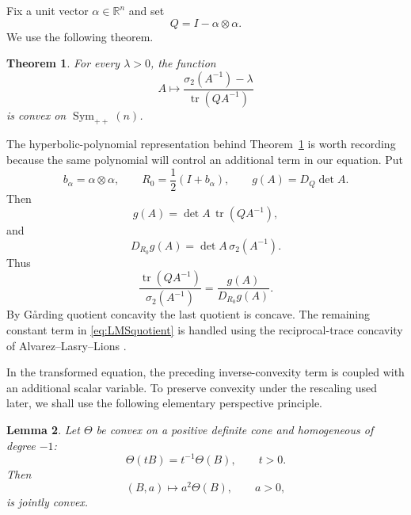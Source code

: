\documentclass{article}
\newtheorem{theorem}{Theorem}[section]
\newtheorem{lemma}[theorem]{Lemma}
\newcommand{\R}{\mathbb R}
\newcommand{\Sym}{\operatorname{Sym}}
\newcommand{\tr}{\operatorname{tr}}
\numberwithin{equation}{section}
\begin{document}
Fix a unit vector $\alpha\in\R^n$ and set
\begin{equation}\label{eq:Qreal}
Q=I-\alpha\otimes\alpha.
\end{equation}
We use the following theorem.

\begin{theorem}\label{thm:LMS}
For every $\lambda>0$, the function
\begin{equation}\label{eq:LMSquotient}
A\longmapsto
\frac{\sigma_2(A^{-1})-\lambda}{\tr(QA^{-1})}
\end{equation}
is convex on $\Sym_{++}(n)$.
\end{theorem}

The hyperbolic-polynomial representation behind Theorem~\ref{thm:LMS} is worth recording because the same polynomial will control an additional term in our equation. Put
\[
b_\alpha=\alpha\otimes\alpha,
\qquad
R_0=\frac12(I+b_\alpha),
\qquad
g(A)=D_Q\det A.
\]
Then
\begin{equation}\label{eq:g-real}
g(A)=\det A\,\tr(QA^{-1}),
\end{equation}
and
\begin{equation}\label{eq:D_R_g-real}
D_{R_0}g(A)=\det A\,\sigma_2(A^{-1}).
\end{equation}
Thus
\[
\frac{\tr(QA^{-1})}{\sigma_2(A^{-1})}
=\frac{g(A)}{D_{R_0}g(A)}.
\]
By G\aa rding quotient concavity the last quotient is concave. The remaining constant term in \eqref{eq:LMSquotient} is handled using the reciprocal-trace concavity of Alvarez--Lasry--Lions \cite{ALL97}.

In the transformed equation, the preceding inverse-convexity term is
coupled with an additional scalar variable. To preserve convexity under
the rescaling used later, we shall use the following elementary
perspective principle.

\begin{lemma}\label{lem:perspective}
Let $\Theta$ be convex on a positive definite cone and homogeneous of degree $-1$:
\[
\Theta(tB)=t^{-1}\Theta(B),\qquad t>0.
\]
Then
\[
(B,a)\longmapsto a^2\Theta(B),\qquad a>0,
\]
is jointly convex.
\end{lemma}
\end{document}
